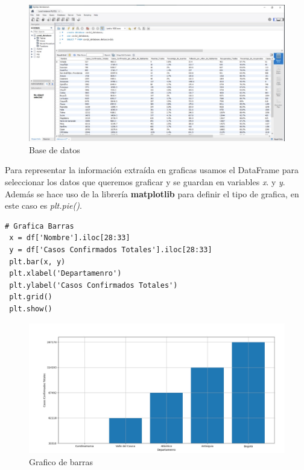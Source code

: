 \documentclass[conference,compsoc,onecolumn]{IEEEtran}
\begin{document}
\begin{figure}[H]
    \centering
    \includegraphics[keepaspectratio , scale = 0.5]{BaseDeDatos.png}
    \caption{Base de datos}\label{BaseDeDatos}
\end{figure}
Para representar la información extraída en graficas usamos el DataFrame para seleccionar los datos que queremos graficar y se guardan en  variables \textit{x}. y \textit{y}. Además se hace uso de la librería \textbf{matplotlib} para definir el tipo de grafica, en este caso es \textit{plt.pie()}.
\lstset{language=Python, breaklines=true, basicstyle=\footnotesize}
\lstset{numbers=left, numberstyle=\tiny, stepnumber=1, numbersep=-2pt}
\begin{lstlisting}[frame=single,caption={Código gráfica de barras },captionpos=b]
 # Grafica Barras
 x = df['Nombre'].iloc[28:33]
 y = df['Casos Confirmados Totales'].iloc[28:33]
 plt.bar(x, y)
 plt.xlabel('Departamenro')
 plt.ylabel('Casos Confirmados Totales')
 plt.grid()
 plt.show()
\end{lstlisting}
\label{cod}

\begin{figure}[H]
    \centering
    \includegraphics[keepaspectratio , scale = 0.3]{Grafica1.jpg}
    \caption{Grafico de barras}\label{GraficoBarras}
\end{figure}
\end{document}

